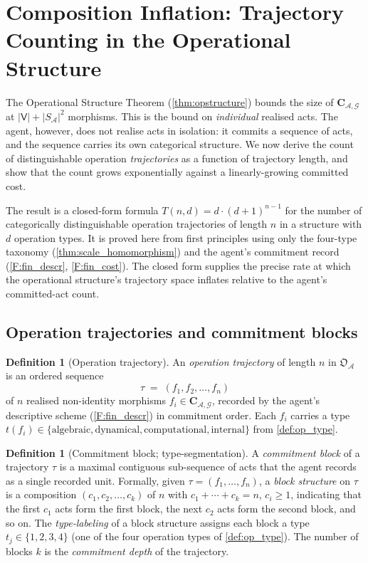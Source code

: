 \documentclass[11pt,twocolumn,a4paper]{article}
\theoremstyle{thmstyle}
\theoremstyle{definition}
\newtheorem{definition}[theorem]{Definition}
\theoremstyle{remark}
\newcommand{\Graph}{\mathcal{G}}
\newcommand{\Vrt}{\mathsf{V}}
\newcommand{\Agent}{\mathcal{A}}
\newcommand{\OpStr}{\mathfrak{O}}
\begin{document}
\section{Composition Inflation: Trajectory Counting in the
Operational Structure}
\label{sec:inflation}

The Operational Structure Theorem (\cref{thm:opstructure}) bounds the
size of $\mathbf{C}_{\Agent,\Graph}$ at $|\Vrt| + |S_\Agent|^2$
morphisms. This is the bound on \emph{individual} realised acts. The
agent, however, does not realise acts in isolation: it commits a
sequence of acts, and the sequence carries its own categorical
structure. We now derive the count of distinguishable operation
\emph{trajectories} as a function of trajectory length, and show
that the count grows exponentially against a linearly-growing
committed cost.

The result is a closed-form formula
$T(n, d) = d \cdot (d+1)^{n-1}$ for the number of categorically
distinguishable operation trajectories of length $n$ in a structure
with $d$ operation types. It is proved here from first principles
using only the four-type taxonomy
(\cref{thm:scale_homomorphism}) and the agent's commitment record
(\cref{F:fin_descr}, \cref{F:fin_cost}). The closed form supplies
the precise rate at which the operational structure's trajectory
space inflates relative to the agent's committed-act count.

\subsection{Operation trajectories and commitment blocks}

\begin{definition}[Operation trajectory]
\label{def:trajectory}
An \emph{operation trajectory} of length $n$ in $\OpStr_\Agent$ is
an ordered sequence
\[
  \tau \;=\; (f_1, f_2, \ldots, f_n)
\]
of $n$ realised non-identity morphisms $f_i \in \mathbf{C}_{\Agent,
\Graph}$, recorded by the agent's descriptive scheme
(\cref{F:fin_descr}) in commitment order. Each $f_i$ carries a type
$t(f_i) \in \{\text{algebraic}, \text{dynamical}, \text{computational},
\text{internal}\}$ from \cref{def:op_type}.
\end{definition}

\begin{definition}[Commitment block; type-segmentation]
\label{def:block}
A \emph{commitment block} of a trajectory $\tau$ is a maximal
contiguous sub-sequence of acts that the agent records as a single
recorded unit. Formally, given $\tau = (f_1, \ldots, f_n)$, a
\emph{block structure} on $\tau$ is a composition
$(c_1, c_2, \ldots, c_k)$ of $n$ with $c_1 + \cdots + c_k = n$,
$c_i \geq 1$, indicating that the first $c_1$ acts form the first
block, the next $c_2$ acts form the second block, and so on. The
\emph{type-labeling} of a block structure assigns each block a type
$t_j \in \{1, 2, 3, 4\}$ (one of the four operation types of
\cref{def:op_type}). The number of blocks $k$ is the
\emph{commitment depth} of the trajectory.
\end{definition}
\end{document}
